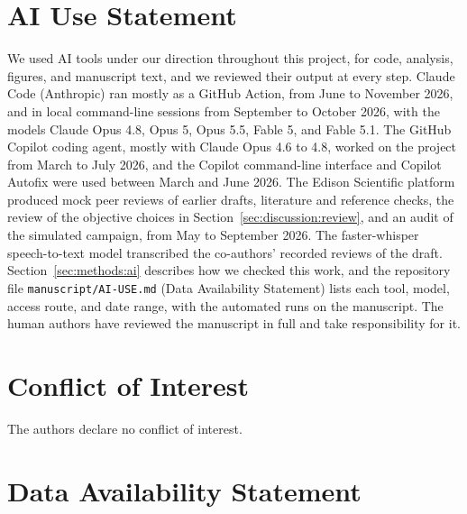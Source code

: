 \documentclass[11pt]{article}
\begin{document}
\section*{AI Use Statement}

We used AI tools under our direction throughout this project, for code,
analysis, figures, and manuscript text, and we reviewed their output at
every step. Claude Code (Anthropic) ran mostly as a GitHub Action, from
June to November 2026, and in local command-line sessions from September
to October 2026, with the models Claude Opus 4.8, Opus 5, Opus 5.5,
Fable 5, and Fable 5.1. The GitHub Copilot coding agent, mostly with
Claude Opus 4.6 to 4.8, worked on the project from March to July 2026,
and the Copilot command-line interface and Copilot Autofix were used
between March and June 2026. The Edison Scientific platform produced mock
peer reviews of earlier drafts, literature and reference checks, the
review of the objective choices in Section~\ref{sec:discussion:review},
and an audit of the simulated campaign, from May to September 2026. The
faster-whisper speech-to-text model transcribed the co-authors' recorded
reviews of the draft. Section~\ref{sec:methods:ai} describes how we
checked this work, and the repository file \texttt{manuscript/AI-USE.md}
(Data Availability Statement) lists each tool, model, access route, and
date range, with the automated runs on the manuscript. The human authors
have reviewed the manuscript in full and take responsibility for it.

\section*{Conflict of Interest}
The authors declare no conflict of interest.

\section*{Data Availability Statement}
\end{document}
